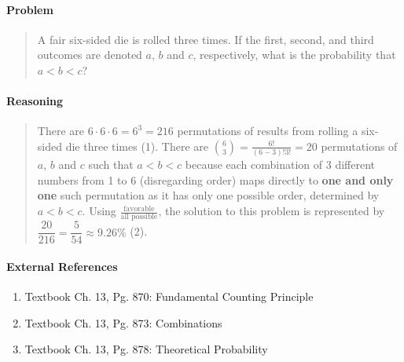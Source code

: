 \documentclass[letterpaper,12pt,twoside]{report}
\begin{document}
	\pagestyle{fancy}
	\fancyhf{}
	
	\paragraph{Problem}
	\begin{quote}
	\textsf{A fair six-sided die is rolled three times. If the first, second, and third outcomes are denoted $a$, $b$ and $c$, respectively, what is the probability that $a<b<c$?}
	\end{quote}
	
	\begin{center}
		\begin{tikzpicture}
		\end{tikzpicture}
	\end{center}
	
	\paragraph{Reasoning}
	\begin{quotation}
	
	There are $6\cdot6\cdot6=6^3=216$ permutations of results from rolling a six-sided die three times (1). There are $\binom{6}{3}=\frac{6!}{(6-3)!3!}=20$ permutations of $a$, $b$ and $c$ such that $a<b<c$ because each combination of 3 different numbers from 1 to 6 (disregarding order) maps directly to \textbf{one and only one} such permutation as it has only one possible order, determined by $a<b<c$. Using $\frac{\text{favorable}}{\text{all possible}}$, the solution to this problem is represented by $\dfrac{20}{216} =\boxed{\dfrac{5}{54} \approx 9.26\%}$ (2).
	
	\end{quotation}
	
	\paragraph{External References}
	
	\begin{enumerate}
		\item Textbook Ch. 13, Pg. 870: Fundamental Counting Principle
		\item Textbook Ch. 13, Pg. 873: Combinations
		\item Textbook Ch. 13, Pg. 878: Theoretical Probability
	\end{enumerate}
\end{document}
